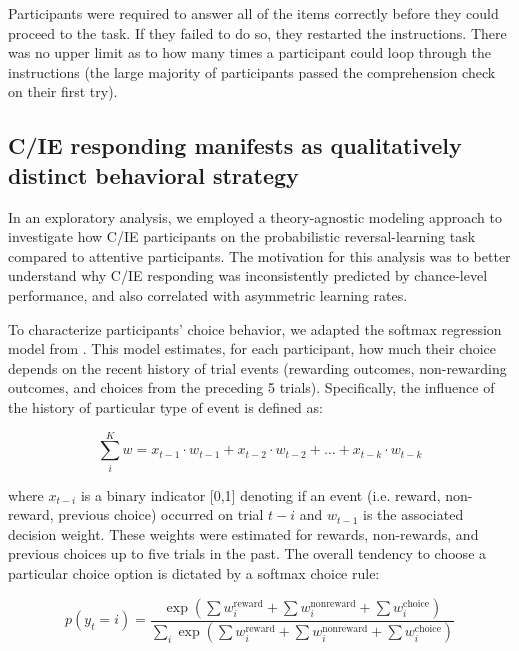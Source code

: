 \documentclass[a4paper,notitlepage,12pt]{article}
\begin{document}
\begin{refsection}[supp]
Participants were required to answer all of the items correctly before they could proceed to the task. If they failed to do so, they restarted the instructions. There was no upper limit as to how many times a participant could loop through the instructions (the large majority of participants passed the comprehension check on their first try).

\subsection*{C/IE responding manifests as qualitatively distinct behavioral strategy}

In an exploratory analysis, we employed a theory-agnostic modeling approach to investigate how C/IE participants on the probabilistic reversal-learning task compared to attentive participants. The motivation for this analysis was to better understand why C/IE responding was inconsistently predicted by chance-level performance, and also correlated with asymmetric learning rates.  

To characterize participants' choice behavior, we adapted the softmax regression model from \cite{seymour2012serotonin}. This model estimates, for each participant, how much their choice depends on the recent history of trial events (rewarding outcomes, non-rewarding outcomes, and choices from the preceding 5 trials). Specifically, the influence of the history of particular type of event is defined as:

\begin{equation*}
    \sum_i^K w = x_{t-1} \cdot w_{t-1} + x_{t-2} \cdot w_{t-2} +  \ldots + x_{t-k} \cdot w_{t-k}
\end{equation*}

where $x_{t-i}$ is a binary indicator [0,1] denoting if an event (i.e. reward, non-reward, previous choice) occurred on trial $t-i$ and $w_{t-1}$ is the associated decision weight. These weights were estimated for rewards, non-rewards, and previous choices up to five trials in the past. The overall tendency to choose a particular choice option is dictated by a softmax choice rule:

\begin{equation*}
    p(y_t = i) = \frac{ \exp \left( \sum w_i^\text{reward} + \sum w_i^\text{nonreward} + \sum w_i^\text{choice} \right) }{ \sum_i \exp \left( \sum w_i^\text{reward} + \sum w_i^\text{nonreward} + \sum w_i^\text{choice} \right) }
\end{equation*}


\end{refsection}
\end{document}
